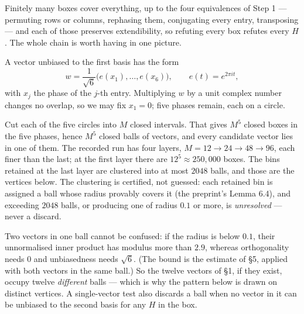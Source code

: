 \documentclass[11pt]{article}
\DeclareMathOperator{\U}{U}
\newcommand{\key}[1]{\par\Needspace{4\baselineskip}\medskip\noindent{\normalsize\bfseries #1}\par\nobreak\vspace{-1pt}}
\begin{document}
Finitely many boxes cover everything, up to the four equivalences of Step 1 --- permuting rows or
columns, rephasing them, conjugating every entry, transposing --- and each of those preserves
extendibility, so refuting every box refutes every $H$. The whole chain is worth having in one picture.

\begin{center}
\end{center}

\key{4.\ The candidates are finitely many balls}

A vector unbiased to the first basis has the form
\[
w=\frac1{\sqrt6}\bigl(e(x_1),\dots,e(x_6)\bigr),\qquad e(t)=e^{2\pi it},
\]
with $x_j$ the phase of the $j$-th entry. Multiplying $w$ by a unit complex number changes no overlap,
so we may fix $x_1=0$; five phases remain, each on a circle.

Cut each of the five circles into $M$ closed intervals. That gives $M^5$ closed boxes in the five
phases, hence $M^5$ closed balls of vectors, and every candidate vector lies in one of them. The
recorded run has four layers, $M=12\to24\to48\to96$, each finer than the last; at the first layer there
are $12^5\approx250{,}000$ boxes. The bins retained at the last layer are clustered into at most $2048$
balls, and those are the vertices below. The clustering is certified, not guessed: each retained bin is
assigned a ball whose radius provably covers it (the preprint's Lemma 6.4), and exceeding $2048$ balls,
or producing one of radius $0.1$ or more, is \emph{unresolved} --- never a discard.

Two vectors in one ball cannot be confused: if the radius is below $0.1$, their unnormalised inner
product has modulus more than $2.9$, whereas orthogonality needs $0$ and unbiasedness needs $\sqrt6$.
(The bound is the estimate of \S5, applied with both vectors in the same ball.) So the twelve vectors
of \S1, if they exist, occupy twelve \emph{different} balls --- which is why the pattern below is drawn
on distinct vertices. A single-vector test also discards a ball when no vector in it can be unbiased to
the second basis for any $H$ in the box.
\end{document}
